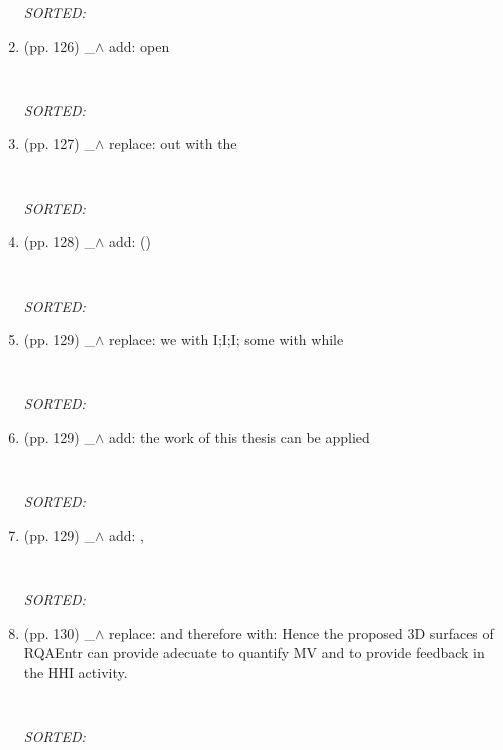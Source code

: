 \documentclass[12pt]{article}
\begin{document}
\begin{enumerate}
\begin{verbatim}
	\end{verbatim}
	\textit{
	SORTED:  
	}
	\\

\item  (pp. 126)  \_$\wedge$  
	add: open
	\begin{verbatim}
	
	\end{verbatim}
	\textit{
	SORTED:  
	}
	\\


\item  (pp. 127)  \_$\wedge$  
	replace: out with the
	\begin{verbatim}
	
	\end{verbatim}
	\textit{
	SORTED:  
	}
	\\


\item  (pp. 128)  \_$\wedge$  
	add: ()
	\begin{verbatim}
	
	\end{verbatim}
	\textit{
	SORTED:  
	}
	\\

\item  (pp. 129)  \_$\wedge$  
	replace: we with I;I;I; some with while
	\begin{verbatim}
	
	\end{verbatim}
	\textit{
	SORTED:  
	}
	\\

\item  (pp. 129)  \_$\wedge$  
	add: the work of this thesis can be applied
	\begin{verbatim}
	
	\end{verbatim}
	\textit{
	SORTED:  
	}
	\\

\item  (pp. 129)  \_$\wedge$  
	add: ,
	\begin{verbatim}
	
	\end{verbatim}
	\textit{
	SORTED:  
	}
	\\


\item  (pp. 130)  \_$\wedge$  
	replace: and therefore with:
	Hence the proposed 3D surfaces of RQAEntr can provide
	adecuate to quantify MV and to provide 
	feedback in the HHI activity.

	\begin{verbatim}
	
	\end{verbatim}
	\textit{
	SORTED:  
	}
	\\







\end{enumerate}
\end{document}
